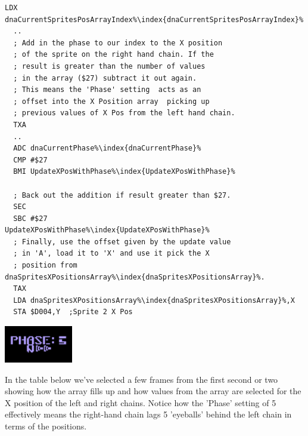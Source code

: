 \begin{minipage}[b]{0.75\linewidth}
\centering
\begin{lstlisting}[caption=\icode{dnaCurrentPhase\index{dnaCurrentPhase}} is set by the 'Q' key.,escapechar=\%]
  LDX dnaCurrentSpritesPosArrayIndex%\index{dnaCurrentSpritesPosArrayIndex}%
  ..
  ; Add in the phase to our index to the X position
  ; of the sprite on the right hand chain. If the 
  ; result is greater than the number of values
  ; in the array ($27) subtract it out again.
  ; This means the 'Phase' setting  acts as an 
  ; offset into the X Position array  picking up 
  ; previous values of X Pos from the left hand chain.
  TXA
  ..
  ADC dnaCurrentPhase%\index{dnaCurrentPhase}%
  CMP #$27
  BMI UpdateXPosWithPhase%\index{UpdateXPosWithPhase}%

  ; Back out the addition if result greater than $27.
  SEC
  SBC #$27
UpdateXPosWithPhase%\index{UpdateXPosWithPhase}%   
  ; Finally, use the offset given by the update value 
  ; in 'A', load it to 'X' and use it pick the X 
  ; position from dnaSpritesXPositionsArray%\index{dnaSpritesXPositionsArray}%.
  TAX
  LDA dnaSpritesXPositionsArray%\index{dnaSpritesXPositionsArray}%,X
  STA $D004,Y  ;Sprite 2 X Pos
\end{lstlisting}
\end{minipage}
\hspace{0.5cm}
\begin{minipage}[b]{0.25\linewidth}
\centering
      \includegraphics[width=3cm]{dna/dnaphase.png}%
      \vspace{5cm}
\end{minipage}

In the table below we've selected a few frames from the first second or two showing how the array fills up and how values from
the array are selected for the X position of the left and right chains. Notice how the 'Phase' setting of 5 effectively means
the right-hand chain lags 5 'eyeballs' behind the left chain in terms of the positions.

